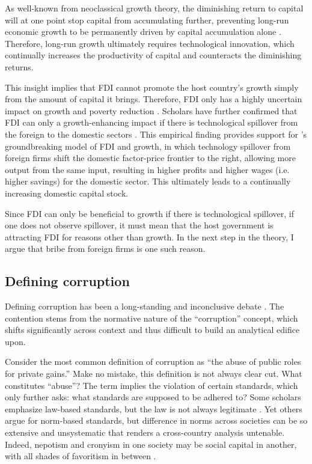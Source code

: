 As well-known from neoclassical growth theory, the diminishing return to capital will at one point stop capital from accumulating further, preventing long-run economic growth to be permanently driven by capital accumulation alone \citep{Solow1956}. Therefore, long-run growth ultimately requires technological innovation, which continually increases the productivity of capital and counteracts the diminishing returns.

This insight implies that FDI cannot promote the host country's growth simply from the amount of capital it brings. Therefore, FDI only has a highly uncertain impact on growth and poverty reduction \citep{Nair-Reichert2001, Carkovic2002, Guerra2009}. Scholars have further confirmed that FDI can only a growth-enhancing impact if there is technological spillover from the foreign to the domestic sectors \citep{Nunnenkamp2004}. This empirical finding provides support for \citet{Findlay1978}'s groundbreaking model of FDI and growth, in which technology spillover from foreign firms shift the domestic factor-price frontier to the right, allowing more output from the same input, resulting in higher profits and higher wages (i.e. higher savings) for the domestic sector. This ultimately leads to a continually increasing domestic capital stock.

Since FDI can only be beneficial to growth if there is technological spillover, if one does not observe spillover, it must mean that the host government is attracting FDI for reasons other than growth. In the next step in the theory, I argue that bribe from foreign firms is one such reason.

\subsection{Defining corruption}

Defining corruption has been a long-standing and inconclusive debate \citep{Johnston1996}. The contention stems from the normative nature of the ``corruption'' concept, which shifts significantly across context and thus difficult to build an analytical edifice upon. 

Consider the most common definition of corruption as ``the abuse of public roles for private gains.'' Make no mistake, this definition is not always clear cut. What constitutes ``abuse''? The term implies the violation of certain standards, which only further asks: what standards are supposed to be adhered to? Some scholars emphasize law-based standards, but the law is not always legitimate \citep[17]{Johnston2004}. Yet others argue for norm-based standards, but difference in norms across societies can be so extensive and unsystematic that renders a cross-country analysis untenable. Indeed, nepotism and cronyism in one society may be social capital in another, with all shades of favoritism in between \citep{Rosen2010}. 

